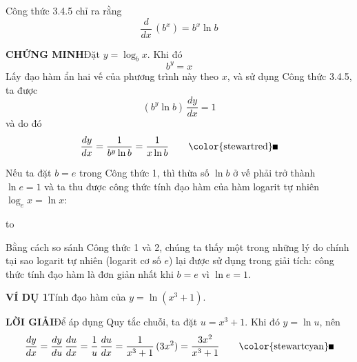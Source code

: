\noindent
\begin{minipage}[t]{0.22\textwidth}
  \vspace*{42pt}
  \fontsize{9pt}{12.5pt}\selectfont
  Công thức 3.4.5 chỉ ra rằng
  \vspace{-0.3em}
  \[
    \frac{d}{dx}\,(b^x) = b^x \ln b
  \]
\end{minipage}%
\hfill
\begin{minipage}[t]{0.75\textwidth}
  \noindent
  \textbf{\textsf{\color{stewartred}CHỨNG MINH}}\quad Đặt $y = \log_b x$. Khi đó
  \[
    b^y = x
  \]
  Lấy đạo hàm ẩn hai vế của phương trình này theo $x$, và sử dụng Công thức 3.4.5, ta được
  \[
    (b^y \ln b)\,\frac{dy}{dx} = 1
  \]
  và do đó
  \[
    \frac{dy}{dx} = \frac{1}{b^y \ln b} = \frac{1}{x \ln b} \tag*{\color{stewartred}\rule{1.15ex}{1.15ex}}
  \]

  Nếu ta đặt $b = e$ trong Công thức 1, thì thừa số $\ln b$ ở vế phải trở thành $\ln e = 1$ và ta thu được công thức tính đạo hàm của hàm logarit tự nhiên $\log_e x = \ln x$:

  \vspace{0.4em}
  \noindent
  \hbox to 
  \vspace{0.5em}

  Bằng cách so sánh Công thức 1 và 2, chúng ta thấy một trong những lý do chính tại sao logarit tự nhiên (logarit cơ số $e$) lại được sử dụng trong giải tích: công thức tính đạo hàm là đơn giản nhất khi $b = e$ vì $\ln e = 1$.

  \vspace{0.7em}
  \noindent
  \textbf{\textsf{\color{stewartcyan}VÍ DỤ 1}}\quad Tính đạo hàm của $y = \ln(x^3 + 1)$.

  \vspace{0.3em}
  \noindent
  \textbf{\textsf{\color{stewartcyan}LỜI GIẢI}}\quad Để áp dụng Quy tắc chuỗi, ta đặt $u = x^3 + 1$. Khi đó $y = \ln u$, nên
  \[
    \frac{dy}{dx} = \frac{dy}{du}\,\frac{du}{dx} = \frac{1}{u}\,\frac{du}{dx} = \frac{1}{x^3 + 1}\,(3x^2) = \frac{3x^2}{x^3 + 1} \tag*{\color{stewartcyan}\rule{1.15ex}{1.15ex}}
  \]


\end{minipage}
